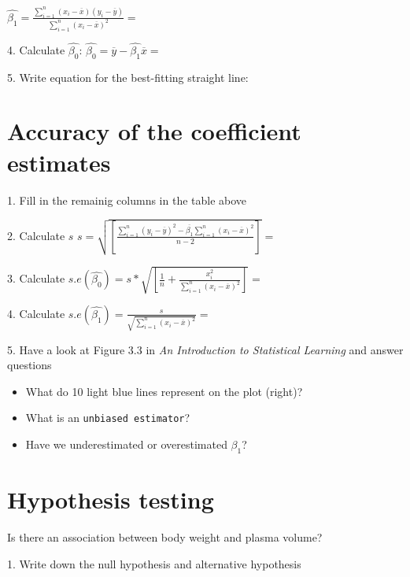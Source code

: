 \documentclass[12pt]{article}\usepackage[]{graphicx}\usepackage[]{color}
\begin{document}
$\hat{\beta_1}= \frac{\sum_{i=1}^{n}(x_i-\overline{x})(y_i-\overline{y})}{\sum_{i=1}^{n}(x_i-\overline{x})^2}=$ \newline
\vspace{0.5cm}

4. Calculate $\hat{\beta_0}$: \newline
\vspace{0.1cm} 
$\hat{\beta_0}=\overline{y}-\hat{\beta_1}\overline{x}=$ \newline

5. Write equation for the best-fitting straight line:



\section{Accuracy of the coefficient estimates}

1. Fill in the remainig columns in the table above
\vspace{1cm} 

2. Calculate $s$
$s=\sqrt{[\frac{\sum_{i=1}^{n}(y_i-\overline{y})^2-\overline{\beta_1}\sum_{i=1}^{n}(x_i-\overline{x})^2}{n-2}]}=$
\vspace{1cm} 

3. Calculate 
$s.e(\hat{\beta_0})=s*\sqrt{[\frac{1}{n}+\frac{x_i^2}{\sum_{i=1}^{n}(x_i-\overline{x})^2}]}=$
\vspace{1cm} 

4. Calculate
$s.e(\hat{\beta_1})=\frac{s}{\sqrt{\sum_{i=1}^{n}(x_i-\overline{x})^2}}=$
\vspace{0.2cm} 

5. Have a look at Figure 3.3 in \textit{An Introduction to Statistical Learning} and answer questions
\begin{itemize}
  \item What do 10 light blue lines represent on the plot (right)?
  \item What is an \texttt{unbiased estimator}?
  \item Have we underestimated or overestimated ${\beta_1}$?
\end{itemize}

\section{Hypothesis testing}
Is there an association between body weight and plasma volume? 

1. Write down the null hypothesis and alternative hypothesis
\end{document}
